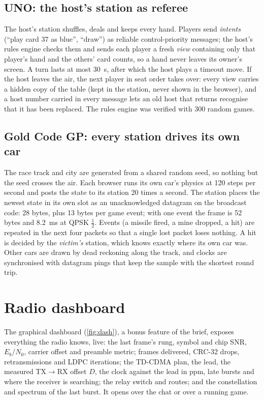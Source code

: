\documentclass[11pt,a4paper,oneside]{report}
\newcommand{\EbNo}{\ensuremath{E_b/N_0}}
\begin{document}
\subsection{UNO: the host's station as referee}
The host's station shuffles, deals and keeps every hand. Players send \emph{intents} (``play card 37
as blue'', ``draw'') as reliable control-priority messages; the host's rules engine checks them and
sends each player a fresh \emph{view} containing only that player's hand and the others' card counts,
so a hand never leaves its owner's screen. A turn lasts at most \SI{30}{s}, after which the host plays a
timeout move. If the host leaves the air, the next player in seat order takes over: every view carries
a hidden copy of the table (kept in the station, never shown in the browser), and a host number
carried in every message lets an old host that returns recognise that it has been replaced. The rules
engine was verified with 300 random games.

\subsection{Gold Code GP: every station drives its own car}
The race track and city are generated from a shared random seed, so nothing but the seed crosses the
air. Each browser runs its own car's physics at 120 steps per second and posts the state to its
station 20 times a second. The station places the newest state in its own slot as an unacknowledged
datagram on the broadcast code: 28 bytes, plus 13 bytes per game event; with one event the frame is
52 bytes and \SI{8.2}{ms} at QPSK $\tfrac12$. Events (a missile fired, a mine dropped, a hit) are repeated
in the next four packets so that a single lost packet loses nothing. A hit is decided by the
\emph{victim's} station, which knows exactly where its own car was. Other cars are drawn by dead
reckoning along the track, and clocks are synchronised with datagram pings that keep the sample with
the shortest round trip.

\section{Radio dashboard}\label{sec:dash}
The graphical dashboard (\cref{fig:dash}), a bonus feature of the brief, exposes everything the radio
knows, live: the last frame's rung, symbol and chip SNR, \EbNo, carrier offset and preamble metric;
frames delivered, CRC-32 drops, retransmissions and LDPC iterations; the TD-CDMA plan, the lead, the
measured TX$\to$RX offset $D$, the clock against the lead in ppm, late bursts and where the receiver is
searching; the relay switch and routes; and the constellation and spectrum of the last burst. It opens
over the chat or over a running game.
\end{document}
